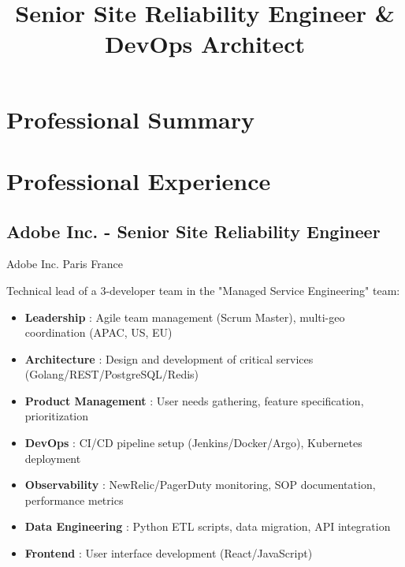 \documentclass[10pt,a4paper,sans]{moderncv}
\title{Senior Site Reliability Engineer \& DevOps Architect}
\begin{document}
\maketitle

\section{Professional Summary}

\section{Professional Experience}

\subsection{Adobe Inc. - Senior Site Reliability Engineer}
        {Adobe Inc.}
        {Paris}
        {France}
        {Technical lead of a 3-developer team in the "Managed Service Engineering" team:
        \begin{itemize}
            \item \textbf{Leadership} : Agile team management (Scrum Master), multi-geo coordination (APAC, US, EU)
            \item \textbf{Architecture} : Design and development of critical services (Golang/REST/PostgreSQL/Redis)
            \item \textbf{Product Management} : User needs gathering, feature specification, prioritization
            \item \textbf{DevOps} : CI/CD pipeline setup (Jenkins/Docker/Argo), Kubernetes deployment
            \item \textbf{Observability} : NewRelic/PagerDuty monitoring, SOP documentation, performance metrics
            \item \textbf{Data Engineering} : Python ETL scripts, data migration, API integration
            \item \textbf{Frontend} : User interface development (React/JavaScript)
        \end{itemize}
        }
\end{document}
